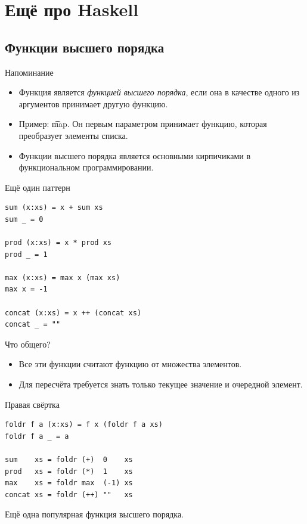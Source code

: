 \section{Ещё про Haskell}
\subsection{Функции высшего порядка}

\begin{frame}
\end{frame}

\begin{frame}{Напоминание}
	\begin{itemize}
		\item Функция является \textit{функцией высшего порядка}, если она в качестве одного из аргументов принимает другую функцию.
		\item Пример: \t{map}. Он первым параметром принимает функцию, которая преобразует элементы списка.
		\item Функции высшего порядка является основными кирпичиками в функциональном программировании.
	\end{itemize}
\end{frame}

\begin{frame}[fragile]{Ещё один паттерн}
\begin{verbatim}
sum (x:xs) = x + sum xs
sum _ = 0

prod (x:xs) = x * prod xs
prod _ = 1

max (x:xs) = max x (max xs)
max x = -1

concat (x:xs) = x ++ (concat xs)
concat _ = ""
\end{verbatim}
	Что общего?
	\pause
	\begin{itemize}
		\item Все эти функции считают функцию от множества элементов.
		\item Для пересчёта требуется знать только текущее значение и очередной элемент.
	\end{itemize}
\end{frame}

\begin{frame}[t,fragile]{Правая свёртка}
\begin{verbatim}
foldr f a (x:xs) = f x (foldr f a xs)
foldr f a _ = a

sum    xs = foldr (+)  0    xs
prod   xs = foldr (*)  1    xs
max    xs = foldr max  (-1) xs
concat xs = foldr (++) ""   xs
\end{verbatim}
	Ещё одна популярная функция высшего порядка.
\end{frame}

